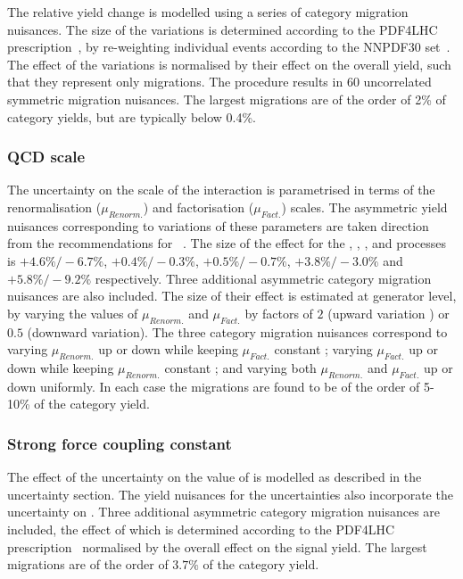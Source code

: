 The relative yield change is modelled using a series of category migration nuisances. The size of the variations is determined according to the PDF4LHC prescription~\cite{Demartin:2010er}, by re-weighting individual events according to the NNPDF30 \PDF set~\cite{Carrazza:2015aoa}. The effect of the variations is normalised by their effect on the overall yield, such that they represent only migrations. The procedure results in 60 uncorrelated symmetric migration nuisances. The largest migrations are of the order of 2\% of category yields, but are typically below 0.4\%.

\subsubsection{QCD scale}
The uncertainty on the scale of the \QCD interaction is parametrised in terms of the renormalisation ($\mu_{Renorm.}$) and factorisation ($\mu_{Fact.}$) scales. The asymmetric yield nuisances corresponding to variations of these parameters are taken direction from the \LHCHXSWG recommendations for \crosssection\s~\cite{LHCHXSWGYR4}. The size of the effect for the \ggH, \VBF, \WH, \ZH and \ttH processes is $+4.6\%/-6.7\%$, $+0.4\%/-0.3\%$, $+0.5\%/-0.7\%$, $+3.8\%/-3.0\%$ and $+5.8\%/-9.2\%$ respectively. Three additional asymmetric category migration nuisances are also included. The size of their effect is estimated at generator level, by varying the values of $\mu_{Renorm.}$ and $\mu_{Fact.}$ by factors of $2$ (upward variation ) or $0.5$ (downward variation). The three category migration nuisances correspond to varying $\mu_{Renorm.}$ up or down while keeping $\mu_{Fact.}$ constant ; varying $\mu_{Fact.}$ up or down while keeping $\mu_{Renorm.}$ constant ; and varying both $\mu_{Renorm.}$ and $\mu_{Fact.}$ up or down uniformly. In each case the migrations are found to be of the order of 5-10\% of the category yield.

\subsubsection{Strong force coupling constant}
The effect of the uncertainty on the value of \alphaS is modelled as described in the \PDF uncertainty section. The yield nuisances for the \PDF uncertainties also incorporate the uncertainty on \alphaS. Three additional asymmetric category migration nuisances are included, the effect of which is determined according to the PDF4LHC prescription~\cite{Demartin:2010er} normalised by the overall effect on the signal yield. The largest migrations are of the order of $3.7\%$ of the category yield. 

